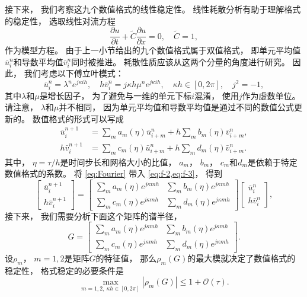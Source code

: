 接下来，
我们考察这九个数值格式的线性稳定性。
线性耗散分析有助于理解格式的稳定性，
选取线性对流方程
\begin{equation}
  \label{eq:linear}
  \dfrac{\partial u}{\partial t} +\widetilde{C}\dfrac{\partial u}{\partial x}=0, \quad \widetilde{C}=1,
\end{equation}
作为模型方程。
由于上一小节给出的九个数值格式属于双值格式，
即单元平均值$\bar u_{i}^n$和导数平均值$\bar v_{i}^n$同时被推进。
耗散性质应该从这两个分量的角度进行研究。
因此，
我们考虑以下傅立叶模式：
\begin{equation}
  \label{eq:Fourier}
  \bar u_{i}^n = \lambda^n e^{j\kappa ih}, \quad
  h \bar v_{i}^n = j\kappa h \mu^n e^{j\kappa ih}, \quad
  \kappa h \in [0,2\pi], \quad j^2=-1,
\end{equation}
其中$\lambda$和$\mu$是增长因子，
为了避免与一维的单元下标$i$混淆，
使用$j$作为虚数单位。
请注意，
$\lambda$和$\mu$并不相同，
因为单元平均值和导数平均值是通过不同的数值公式更新的。
数值格式的形式可以写成
\begin{align}
  \label{eq:f-2}
  \bar u_{i}^{n+1}   & = \sum_m a_m(\eta) \bar u_{i+m}^n + h\sum_m b_m(\eta) \bar v_{i+m}^n,  \\
  \label{eq:f-3}
  h \bar v_{i}^{n+1} & = \sum_m c_m(\eta) \bar u_{i+m}^n + h\sum_m d_m(\eta) \bar v_{i+m}^n.
\end{align}
其中，
$\eta=\tau / h$是时间步长和网格大小的比值，
$a_m$，
$b_m$，
$c_m$和$d_m$是依赖于特定数值格式的系数。
将 \cref{eq:Fourier} 带入 \cref{eq:f-2,eq:f-3}，
得到
\begin{equation}
  \begin{bmatrix} \bar u_{i}^{n+1} \\[6mm]
    h \bar v_{i}^{n+1}\end{bmatrix}
  = \begin{bmatrix}
    \displaystyle \sum_m a_m(\eta) e^{j\kappa mh} & \displaystyle \sum_m b_m(\eta) e^{j\kappa mh} \\
    \displaystyle \sum_m c_m(\eta) e^{j\kappa mh} & \displaystyle \sum_m d_m(\eta) e^{j\kappa mh}
  \end{bmatrix}
  \begin{bmatrix} \bar u_{i}^{n} \\[6mm]
    h \bar v_{i}^{n}\end{bmatrix},
\end{equation}
接下来，
我们需要分析下面这个矩阵的谱半径，
\begin{equation}
  G=
  \begin{bmatrix}
    \displaystyle \sum_m a_m(\eta) e^{j\kappa mh} & \displaystyle \sum_m b_m(\eta) e^{j\kappa mh} \\
    \displaystyle \sum_m c_m(\eta) e^{j\kappa mh} & \displaystyle \sum_m d_m(\eta) e^{j\kappa mh}
  \end{bmatrix}.
\end{equation}
设$\rho_m$，
$m=1,2$是矩阵$G$的特征值，
那么$\rho_m(G)$的最大模就决定了数值格式的稳定性，
格式稳定的必要条件是
\begin{equation}
  \label{eq:stability-condition}
  \max_{m=1,2,~\kappa h\in[0,2\pi]} |\rho_m(G)|\le 1+\mathcal{O}(\tau).
\end{equation}

